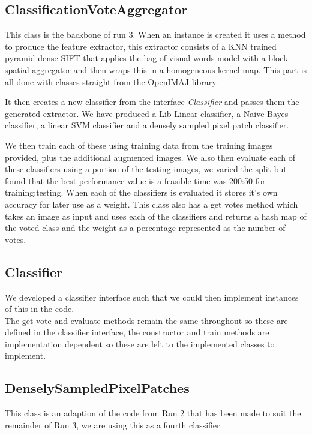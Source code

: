 \documentclass{article}
\begin{document}
	\subsection{ClassificationVoteAggregator}
	This class is the backbone of run 3. When an instance is created it uses a method to produce the feature extractor, this extractor consists of a KNN trained pyramid dense SIFT that applies the bag of visual words model with a block spatial aggregator and then wraps this in a homogeneous kernel map. This part is all done with classes straight from the OpenIMAJ library.
	\newline
	
	It then creates a new classifier from the interface \textit{Classifier} and passes them the generated extractor. We have produced a Lib Linear classifier, a Naive Bayes classifier, a linear SVM classifier and a densely sampled pixel patch classifier.
	\newline
	
	We then train each of these using training data from the training images provided, plus the additional augmented images. We also then evaluate each of these classifiers using a portion of the testing images, we varied the split but found that the best performance value is a feasible time was 200:50 for training:testing. When each of the classifiers is evaluated it stores it's own accuracy for later use as a weight. This class also has a get votes method which takes an image as input and uses each of the classifiers and returns a hash map of the voted class and the weight as a percentage represented as the number of votes.
	
	\subsection{Classifier}
	We developed a classifier interface such that we could then implement instances of this in the code.\\
	The get vote and evaluate methods remain the same throughout so these are defined in the classifier interface, the constructor and train methods are implementation dependent so these are left to the implemented classes to implement.
	
	\subsection{DenselySampledPixelPatches}
	This class is an adaption of the code from Run 2 that has been made to suit the remainder of Run 3, we are using this as a fourth classifier.
	
\end{document}
